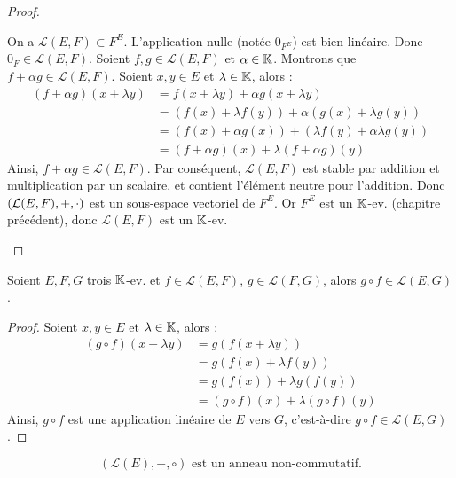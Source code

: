 \documentclass[12pt,a4paper]{report}
\begin{document}
\begin{proof}
    \begin{outline}
        \1 On a $\mathcal L(E,F) \subset F^E$.
        \1 L'application nulle (notée $0_{F^E}$) est bien linéaire. Donc $0_F \in \mathcal L(E,F)$.
        \1 Soient $f,g \in \mathcal L(E,F)$ et $\alpha \in \mathbb{K}$. Montrons que $f + \alpha g \in \mathcal L(E,F)$. Soient $x,y \in E$ et $\lambda \in \mathbb{K}$, alors :
        \begin{align*}
            (f + \alpha g)(x + \lambda y) &= f(x + \lambda y) + \alpha g(x + \lambda y)\\
            &= (f(x) + \lambda f(y)) + \alpha(g(x) + \lambda g(y))\\
            &= (f(x) + \alpha g(x)) + (\lambda f(y) + \alpha \lambda g(y))\\
            &= (f + \alpha g)(x) + \lambda (f + \alpha g)(y)
        \end{align*}
        \1 Ainsi, $f + \alpha g \in \mathcal L(E,F)$.
        \1 Par conséquent, $\mathcal L(E,F)$ est stable par addition et multiplication par un scalaire, et contient l'élément neutre pour l'addition. Donc $\left(\mathcal L(E,F), +, \cdot\right)$ est un sous-espace vectoriel de $F^E$. Or $F^E$ est un $\mathbb{K}$-ev. (chapitre précédent), donc $\mathcal L(E,F)$ est un $\mathbb{K}$-ev.
    \end{outline}
\end{proof}

\begin{property}
    Soient $E,F,G$ trois $\mathbb{K}$-ev. et $f \in \mathcal L(E,F)$, $g \in \mathcal L(F,G)$, alors $g \circ f \in \mathcal L(E,G)$.
\end{property}

\begin{proof}
    Soient $x,y \in E$ et $\lambda \in \mathbb{K}$, alors :
    \begin{align*}
        (g \circ f)(x + \lambda y) &= g(f(x + \lambda y))\\
        &= g(f(x) + \lambda f(y))\\
        &= g(f(x)) + \lambda g(f(y))\\
        &= (g \circ f)(x) + \lambda (g \circ f)(y)
    \end{align*}
    Ainsi, $g \circ f$ est une application linéaire de $E$ vers $G$, c'est-à-dire $g \circ f \in \mathcal L(E,G)$.
\end{proof}

\begin{property}
    $$(\mathcal L(E), +, \circ) \text{ est un anneau non-commutatif.}$$
\end{property}
\end{document}
